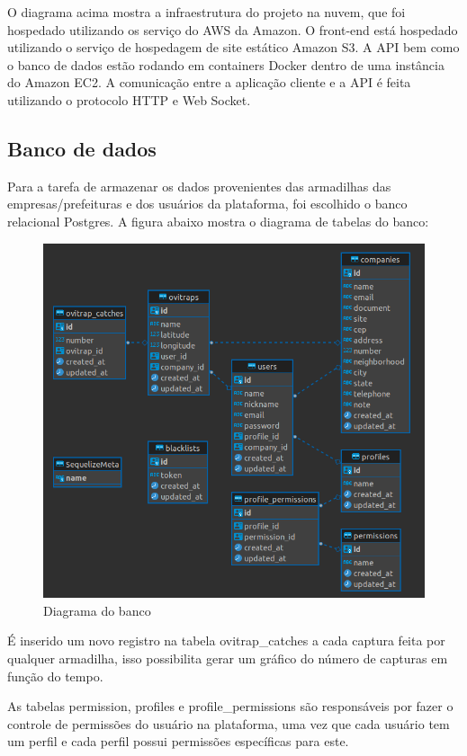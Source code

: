 \documentclass[
	12pt,				%
	openright,			%
	oneside,			%
	a4paper,			%
	chapter=TITLE,		%
	english,			%
	brazil				%
	]{abntex2}
\begin{document}
O diagrama acima mostra a infraestrutura do projeto na nuvem, que foi hospedado utilizando os serviço do AWS da Amazon. O front-end está hospedado
utilizando o serviço de hospedagem de site estático Amazon S3. A API bem como o banco de dados estão rodando em containers Docker dentro de 
uma instância do Amazon EC2. A comunicação entre a aplicação cliente e a API é feita utilizando o protocolo HTTP e Web Socket.

\subsection{Banco de dados}

Para a tarefa de armazenar os dados provenientes das armadilhas das empresas/prefeituras e dos usuários da plataforma, 
foi escolhido o banco relacional Postgres. A figura abaixo mostra o diagrama de tabelas do banco:

\begin{figure}[H]
\centering
\includegraphics[scale=0.5]{imagens/EsquemaBanco.png}
\caption{Diagrama do banco}
    \label{fig:banco}
\end{figure}

É inserido um novo registro na tabela ovitrap\_catches a cada captura feita por qualquer armadilha, isso possibilita gerar um gráfico do 
número de capturas em função do tempo.

As tabelas permission, profiles e profile\_permissions são responsáveis por fazer o controle de permissões do usuário na plataforma, 
uma vez que cada usuário tem um perfil e cada perfil possui permissões específicas para este. 
\end{document}
